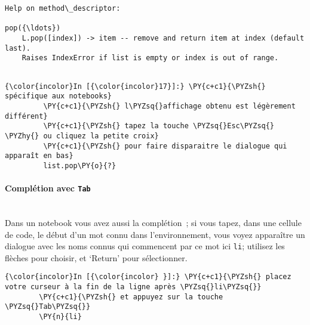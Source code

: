     \begin{Verbatim}[commandchars=\\\{\}]
Help on method\_descriptor:

pop({\ldots})
    L.pop([index]) -> item -- remove and return item at index (default last).
    Raises IndexError if list is empty or index is out of range.


    \end{Verbatim}

    \begin{Verbatim}[commandchars=\\\{\}]
{\color{incolor}In [{\color{incolor}17}]:} \PY{c+c1}{\PYZsh{} spécifique aux notebooks}
         \PY{c+c1}{\PYZsh{} l\PYZsq{}affichage obtenu est légèrement différent}
         \PY{c+c1}{\PYZsh{} tapez la touche \PYZsq{}Esc\PYZsq{} \PYZhy{} ou cliquez la petite croix}
         \PY{c+c1}{\PYZsh{} pour faire disparaitre le dialogue qui apparaît en bas}
         list.pop\PY{o}{?}
\end{Verbatim}


    \hypertarget{compluxe9tion-avec-tab}{%
\paragraph{\texorpdfstring{Complétion avec
\texttt{Tab}}{Complétion avec Tab}\\\\}\label{compluxe9tion-avec-tab}}

    Dans un notebook vous avez aussi la complétion~; si vous tapez, dans une
cellule de code, le début d'un mot connu dans l'environnement, vous
voyez apparaître un dialogue avec les noms connus qui commencent par ce
mot ici \texttt{li}; utilisez les flèches pour choisir, et `Return' pour
sélectionner.

    \begin{Verbatim}[commandchars=\\\{\}]
{\color{incolor}In [{\color{incolor} }]:} \PY{c+c1}{\PYZsh{} placez votre curseur à la fin de la ligne après \PYZsq{}li\PYZsq{}}
        \PY{c+c1}{\PYZsh{} et appuyez sur la touche \PYZsq{}Tab\PYZsq{}}
        \PY{n}{li}
\end{Verbatim}